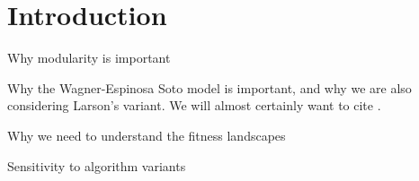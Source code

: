 \section{Introduction}
Why modularity is important

Why the Wagner-Espinosa Soto model is important, and why we are also 
considering Larson's variant. We will almost certainly want to cite \cite{espinosa2010specialization}.

Why we need to understand the fitness landscapes

Sensitivity to algorithm variants

